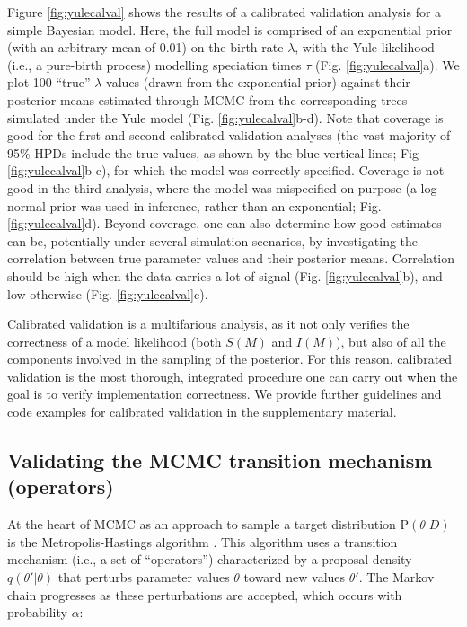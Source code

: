 \documentclass[oneside]{article}
\begin{document}
Figure \ref{fig:yulecalval} shows the results of a calibrated
validation analysis for a simple Bayesian model.
Here, the full model is comprised of an exponential prior (with an
arbitrary mean of 0.01) on the birth-rate
$\lambda$, with the Yule likelihood (i.e., a pure-birth process)
modelling speciation times $\tau$ (Fig. \ref{fig:yulecalval}a).
We plot 100 ``true'' $\lambda$ values (drawn from the exponential prior)
against their posterior means estimated through MCMC from the
corresponding trees simulated under the Yule model
(Fig. \ref{fig:yulecalval}b-d).
Note that coverage is good for the first and second calibrated
validation analyses (the vast majority of 95\%-HPDs
include the true values, as shown by the blue vertical lines; Fig
\ref{fig:yulecalval}b-c), for which the model was correctly
specified.
Coverage is not good in the third analysis, where the model was
mispecified on purpose (a log-normal prior was used in inference,
rather than an exponential; Fig. \ref{fig:yulecalval}d).
Beyond coverage, one can also determine how good estimates can be,
potentially under several simulation scenarios, by investigating the
correlation between true parameter values and their posterior means.
Correlation should be high when the data carries a lot of
signal (Fig. \ref{fig:yulecalval}b), and low otherwise (Fig. \ref{fig:yulecalval}c).

Calibrated validation is a multifarious
analysis, as it not only verifies the correctness of a model
likelihood (both $S(M)$ and $I(M)$), but also of all the components
involved in the sampling of the posterior.
For this reason, calibrated validation is the most thorough,
integrated procedure one can carry out when the goal is to verify
implementation correctness.
We provide further guidelines and code examples for
calibrated validation in the supplementary material.

\subsection*{Validating the MCMC transition mechanism (operators)}

At the heart of MCMC as an approach to sample a target distribution
$\text{P}(\theta|D)$ is the Metropolis-Hastings algorithm
\citep{mh}.
This algorithm uses a transition mechanism (i.e., a set of
``operators'') characterized by a proposal density $q(\theta'|\theta)$
that perturbs parameter values $\theta$ toward new values $\theta'$.
The Markov chain progresses as these perturbations are accepted, which
occurs with probability $\alpha$:
\end{document}
